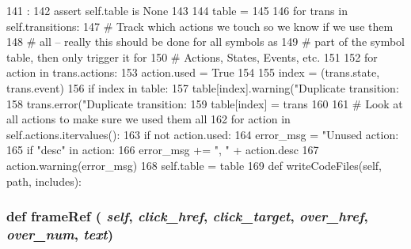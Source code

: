 \begin{DoxyCode}
141                         :
142         assert self.table is None
143 
144         table = {}
145 
146         for trans in self.transitions:
147             # Track which actions we touch so we know if we use them
148             # all -- really this should be done for all symbols as
149             # part of the symbol table, then only trigger it for
150             # Actions, States, Events, etc.
151 
152             for action in trans.actions:
153                 action.used = True
154 
155             index = (trans.state, trans.event)
156             if index in table:
157                 table[index].warning("Duplicate transition: %
158                 trans.error("Duplicate transition: %
159             table[index] = trans
160 
161         # Look at all actions to make sure we used them all
162         for action in self.actions.itervalues():
163             if not action.used:
164                 error_msg = "Unused action: %
165                 if "desc" in action:
166                     error_msg += ", "  + action.desc
167                 action.warning(error_msg)
168         self.table = table
169 
    def writeCodeFiles(self, path, includes):
\end{DoxyCode}
\hypertarget{classslicc_1_1symbols_1_1StateMachine_1_1StateMachine_acece50be46cc760cf24771b26ee54557}{
\subsubsection[{frameRef}]{\setlength{\rightskip}{0pt plus 5cm}def frameRef ( {\em self}, \/   {\em click\_\-href}, \/   {\em click\_\-target}, \/   {\em over\_\-href}, \/   {\em over\_\-num}, \/   {\em text})}}
\label{classslicc_1_1symbols_1_1StateMachine_1_1StateMachine_acece50be46cc760cf24771b26ee54557}



